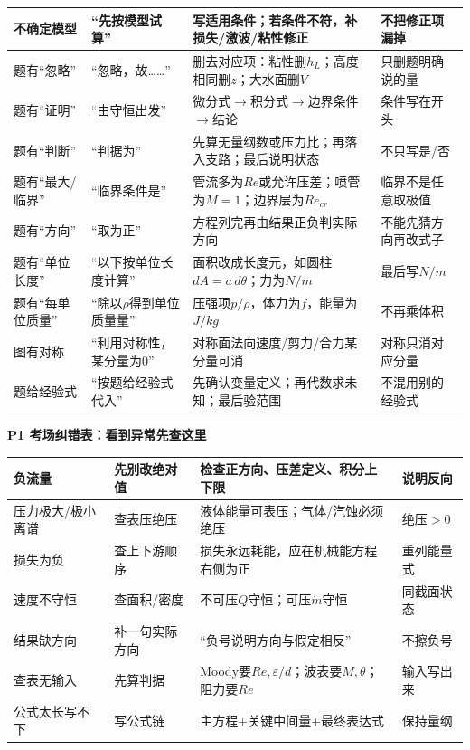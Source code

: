 \documentclass[UTF8,a4paper]{ctexart}
\newcommand{\ftitle}[1]{\vspace{1pt}\textbf{\textcolor{B}{#1}}\par\vspace{0.5pt}}
\begin{document}
\begin{tabular}{|L{0.19\textwidth}|L{0.23\textwidth}|L{0.34\textwidth}|L{0.19\textwidth}|}\hline
不确定模型 & “先按\underline{\hspace{0.4cm}}模型试算” & 写适用条件；若条件不符，补损失/激波/粘性修正 & 不把修正项漏掉 \\\hline
题有“忽略” & “忽略\underline{\hspace{0.4cm}}，故……” & 删去对应项：粘性删$h_L$；高度相同删$z$；大水面删$V$ & 只删题明确说的量 \\\hline
题有“证明” & “由\underline{\hspace{0.5cm}}守恒出发” & 微分式$\to$积分式$\to$边界条件$\to$结论 & 条件写在开头 \\\hline
题有“判断” & “判据为\underline{\hspace{0.5cm}}” & 先算无量纲数或压力比；再落入支路；最后说明状态 & 不只写是/否 \\\hline
题有“最大/临界” & “临界条件是\underline{\hspace{0.5cm}}” & 管流多为$Re$或允许压差；喷管为$M=1$；边界层为$Re_{cr}$ & 临界不是任意取极值 \\\hline
题有“方向” & “取\underline{\hspace{0.4cm}}为正” & 方程列完再由结果正负判实际方向 & 不能先猜方向再改式子 \\\hline
题有“单位长度” & “以下按单位长度计算” & 面积改成长度元，如圆柱$dA=a\,d\theta$；力为$N/m$ & 最后写$N/m$ \\\hline
题有“每单位质量” & “除以$\rho$得到单位质量量” & 压强项$p/\rho$，体力为$f$，能量为$J/kg$ & 不再乘体积 \\\hline
图有对称 & “利用对称性，某分量为0” & 对称面法向速度/剪力/合力某分量可消 & 对称只消对应分量 \\\hline
题给经验式 & “按题给经验式代入” & 先确认变量定义；再代数求未知；最后验范围 & 不混用别的经验式 \\\hline
\end{tabular}
\ftitle{P1 考场纠错表：看到异常先查这里}
\begin{tabular}{|L{0.22\textwidth}|L{0.25\textwidth}|L{0.33\textwidth}|L{0.15\textwidth}|}\hline
负流量 & 先别改绝对值 & 检查正方向、压差定义、积分上下限 & 说明反向 \\\hline
压力极大/极小离谱 & 查表压绝压 & 液体能量可表压；气体/汽蚀必须绝压 & 绝压$>0$ \\\hline
损失为负 & 查上下游顺序 & 损失永远耗能，应在机械能方程右侧为正 & 重列能量式 \\\hline
速度不守恒 & 查面积/密度 & 不可压$Q$守恒；可压$\dot m$守恒 & 同截面状态 \\\hline
结果缺方向 & 补一句实际方向 & “负号说明方向与假定相反” & 不擦负号 \\\hline
查表无输入 & 先算判据 & Moody要$Re,\varepsilon/d$；波表要$M,\theta$；阻力要$Re$ & 输入写出来 \\\hline
公式太长写不下 & 写公式链 & 主方程+关键中间量+最终表达式 & 保持量纲 \\\hline
\end{tabular}
\newpage
\end{document}
